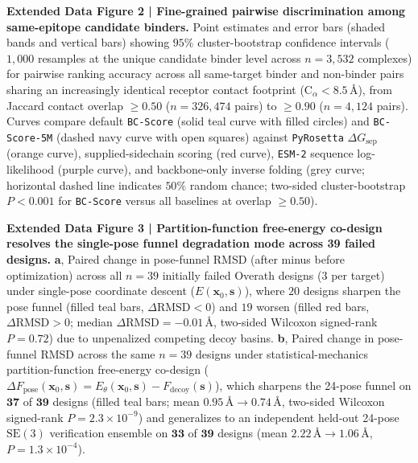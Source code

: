 \documentclass[11pt]{article}
\begin{document}
\textbf{Extended Data Figure 2 | Fine-grained pairwise discrimination among same-epitope candidate binders.}
Point estimates and error bars (shaded bands and vertical bars) showing $95\%$ cluster-bootstrap confidence intervals ($1,000$ resamples at the unique candidate binder level across $n = 3,532$ complexes) for pairwise ranking accuracy across all same-target binder and non-binder pairs sharing an increasingly identical receptor contact footprint ($\text{C}_\alpha < 8.5\,\text{\AA}$), from Jaccard contact overlap $\ge 0.50$ ($n = 326,474$ pairs) to $\ge 0.90$ ($n = 4,124$ pairs). Curves compare default \texttt{BC-Score} (solid teal curve with filled circles) and \texttt{BC-Score-5M} (dashed navy curve with open squares) against \texttt{PyRosetta} $\Delta G_{\text{sep}}$ (orange curve), supplied-sidechain scoring (red curve), \texttt{ESM-2} sequence log-likelihood (purple curve), and backbone-only inverse folding (grey curve; horizontal dashed line indicates $50\%$ random chance; two-sided cluster-bootstrap $P < 0.001$ for \texttt{BC-Score} versus all baselines at overlap $\ge 0.50$).

\textbf{Extended Data Figure 3 | Partition-function free-energy co-design resolves the single-pose funnel degradation mode across 39 failed designs.}
\textbf{a}, Paired change in pose-funnel RMSD (after minus before optimization) across all $n = 39$ initially failed Overath designs ($3$ per target) under single-pose coordinate descent ($E(\mathbf{x}_0, \mathbf{s})$), where $20$ designs sharpen the pose funnel (filled teal bars, $\Delta\text{RMSD} < 0$) and $19$ worsen (filled red bars, $\Delta\text{RMSD} > 0$; median $\Delta\text{RMSD} = -0.01\,\text{\AA}$, two-sided Wilcoxon signed-rank $P = 0.72$) due to unpenalized competing decoy basins.
\textbf{b}, Paired change in pose-funnel RMSD across the same $n = 39$ designs under statistical-mechanics partition-function free-energy co-design ($\Delta F_{\text{pose}}(\mathbf{x}_0, \mathbf{s}) = E_\theta(\mathbf{x}_0, \mathbf{s}) - F_{\text{decoy}}(\mathbf{s})$), which sharpens the 24-pose funnel on $\mathbf{37}$ of $\mathbf{39}$ designs (filled teal bars; mean $0.95\,\text{\AA} \to 0.74\,\text{\AA}$, two-sided Wilcoxon signed-rank $P = 2.3\times 10^{-9}$) and generalizes to an independent held-out 24-pose $\text{SE}(3)$ verification ensemble on $\mathbf{33}$ of $\mathbf{39}$ designs (mean $2.22\,\text{\AA} \to 1.06\,\text{\AA}$, $P = 1.3\times 10^{-4}$).
\end{document}
